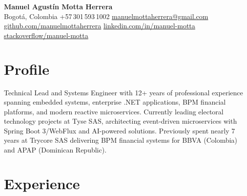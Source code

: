 \documentclass[11pt,a4paper]{article}
\begin{document}
\begin{center}
    {\LARGE\bfseries\color{darktext} Manuel Agust\'{i}n Motta Herrera} \\[8pt]
    {\color{lighttext}
        \faMapMarker*\enspace Bogot\'{a}, Colombia \quad\textbar\quad
        \faPhone*\enspace +57\,301\,593\,1002 \quad\textbar\quad
        \faEnvelope\enspace \href{mailto:manuelmottaherrera@gmail.com}{manuelmottaherrera@gmail.com}
    } \\[4pt]
    {\color{lighttext}
        \faGithub\enspace \href{https://github.com/manuelmottaherrera}{github.com/manuelmottaherrera} \quad\textbar\quad
        \faLinkedin\enspace \href{https://www.linkedin.com/in/manuel-motta-65b84a1a7}{linkedin.com/in/manuel-motta} \quad\textbar\quad
        \faStackOverflow\enspace \href{https://stackoverflow.com/users/13502779}{stackoverflow/manuel-motta}
    }
\end{center}

\vspace{-2pt}

\section{Profile}

Technical Lead and Systems Engineer with 12+ years of professional experience spanning embedded systems, enterprise .NET applications, BPM financial platforms, and modern reactive microservices. Currently leading electoral technology projects at Tyse SAS, architecting event-driven microservices with Spring Boot 3/WebFlux and AI-powered solutions. Previously spent nearly 7 years at Trycore SAS delivering BPM financial systems for BBVA (Colombia) and APAP (Dominican Republic).

\section{Experience}
\end{document}
